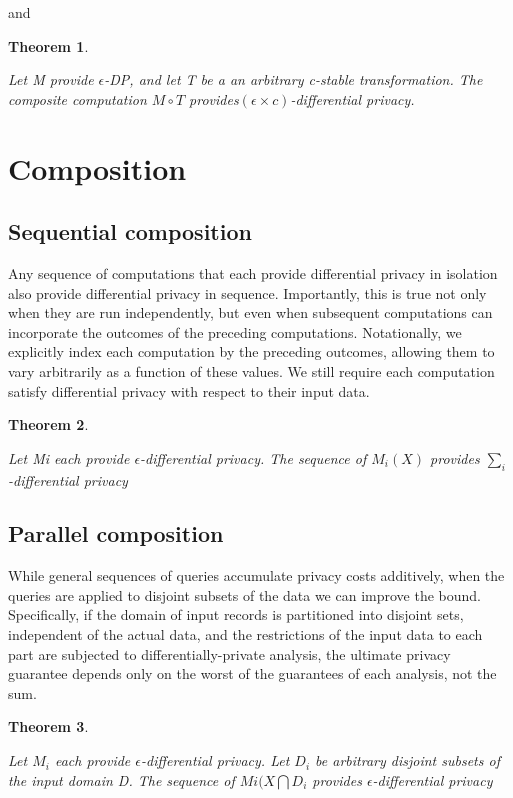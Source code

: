 \documentclass{article}
\newtheorem{thm}{Theorem}[section]
\newenvironment{theorem}{\begin{thm}\begin{rm}}%
{\end{rm}\end{thm}}
\begin{document}
and 
\begin{theorem}
Let M provide $\epsilon$-DP, and let T be a an arbitrary c-stable transformation. The composite computation $M \circ T$ provides$(\epsilon \times c)$-differential privacy. 
\end{theorem}

\section{Composition}

\subsection{Sequential composition}
Any sequence of computations that each provide differential
privacy in isolation also provide differential privacy in sequence.
Importantly, this is true not only when they are run
independently, but even when subsequent computations can
incorporate the outcomes of the preceding computations.
Notationally, we explicitly index each computation by the
preceding outcomes, allowing them to vary arbitrarily as a
function of these values. We still require each computation
satisfy differential privacy with respect to their input data.

\begin{theorem}
Let Mi each provide $\epsilon$-differential privacy.
The sequence of $M_i(X)$ provides $\sum\limits_{i}$-differential privacy
\end{theorem}

\subsection{Parallel composition}
While general sequences of queries accumulate privacy
costs additively, when the queries are applied to disjoint subsets
of the data we can improve the bound. Specifically, if
the domain of input records is partitioned into disjoint sets,
independent of the actual data, and the restrictions of the
input data to each part are subjected to differentially-private
analysis, the ultimate privacy guarantee depends only on the
worst of the guarantees of each analysis, not the sum.

\begin{theorem}
Let $M_i$ each provide $\epsilon$-differential privacy.
Let $D_i$ be arbitrary disjoint subsets of the input domain D.
The sequence of $Mi(X \bigcap D_i$ provides $\epsilon$-differential privacy
\end{theorem}





%
%
\end{document}
